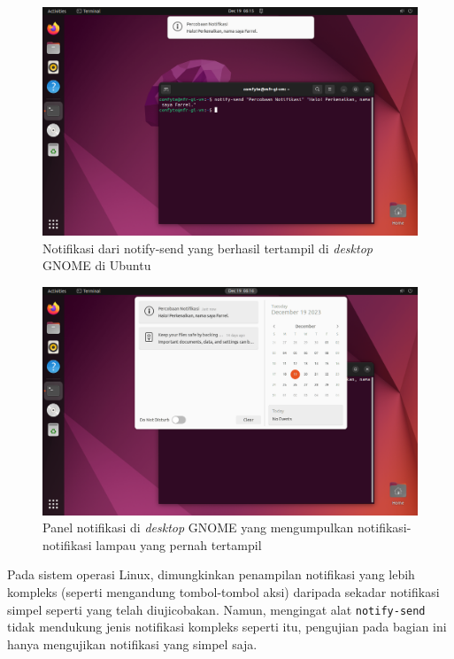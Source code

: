 \begin{figure}
    \centering
    \includegraphics[width=1\linewidth]{assets/Screenshot from 2023-12-19 06-15-10.png}
    \caption{Notifikasi dari notify-send yang berhasil tertampil di \textit{desktop} GNOME di Ubuntu}
    \label{ubuntu-notify-send-demo}
\end{figure}

\begin{figure}
    \centering
    \includegraphics[width=1\linewidth]{assets/Screenshot from 2023-12-19 06-16-29.png}
    \caption{Panel notifikasi di \textit{desktop} GNOME yang mengumpulkan notifikasi-notifikasi lampau yang pernah tertampil}
    \label{ubuntu-notification-panel}
\end{figure}

Pada sistem operasi Linux, dimungkinkan penampilan notifikasi yang lebih kompleks (seperti mengandung tombol-tombol aksi) daripada sekadar notifikasi simpel seperti yang telah diujicobakan. Namun, mengingat alat \verb|notify-send| tidak mendukung jenis notifikasi kompleks seperti itu, pengujian pada bagian ini hanya mengujikan notifikasi yang simpel saja.

